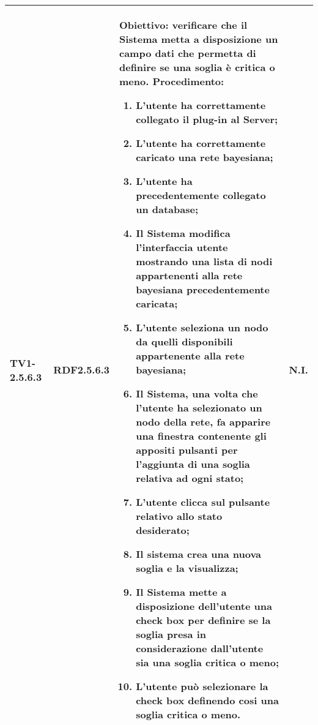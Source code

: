 \begin{longtable}{|C{.15\textwidth}|C{.13\textwidth}|m{.65\textwidth}|C{.08\textwidth}|}
TV1-2.5.6.3 & RDF2.5.6.3  &
	\textbf{Obiettivo}: verificare che il Sistema metta a disposizione un campo dati che permetta di definire se una soglia è critica o meno.  \newline
	\textbf{Procedimento}:
	\begin{enumerate}
		\item L'utente ha correttamente collegato il plug-in al Server;
		\item L'utente ha correttamente caricato una rete bayesiana;
		\item L'utente ha precedentemente collegato un database;
		\item Il Sistema modifica l'interfaccia utente mostrando una lista di nodi appartenenti alla rete bayesiana precedentemente caricata;
		\item L'utente seleziona un nodo da quelli disponibili appartenente alla rete bayesiana;
		\item Il Sistema, una volta che l'utente ha selezionato un nodo della rete, fa apparire una finestra contenente gli appositi pulsanti per l'aggiunta di una soglia relativa ad ogni stato;
		\item L'utente clicca sul pulsante relativo allo stato desiderato;
		\item Il sistema crea una nuova soglia e la visualizza;
		\item Il Sistema mette a disposizione dell'utente una check box per definire se la soglia presa in considerazione dall'utente sia una soglia critica o meno;
		\item L'utente può selezionare la check box definendo cosi una soglia critica o meno.
	\end{enumerate}
	& N.I. \\
\hline


\end{longtable}

